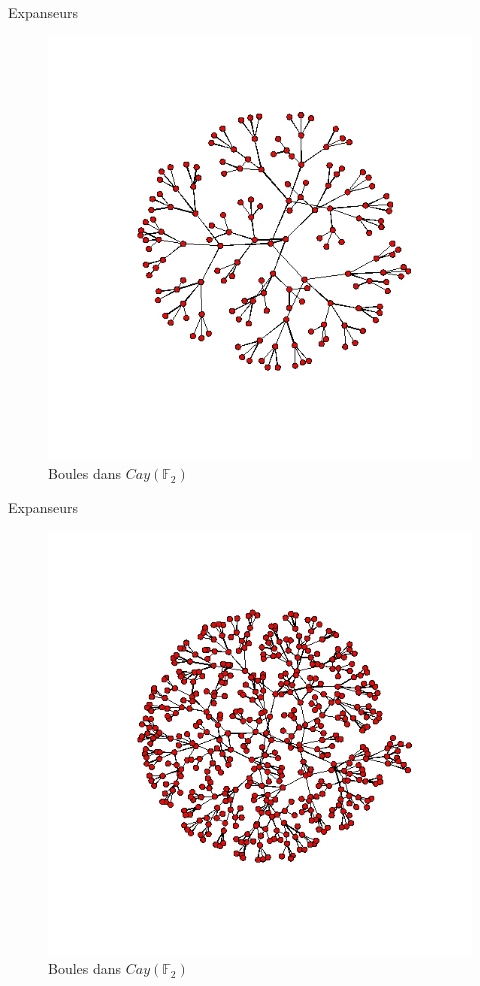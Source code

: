 \begin{frame}{Expanseurs}
\begin{figure}[h]\centering
\includegraphics[scale=0.35]{CayleyFree3.jpeg}
\caption{Boules dans $Cay(\mathbb F_2)$}
\label{fig:Cayley2}
\end{figure}
\end{frame}
\begin{frame}{Expanseurs}
\begin{figure}[h]\centering
\includegraphics[scale=0.35]{CayleyFree4.jpeg}
\caption{Boules dans $Cay(\mathbb F_2)$}
\label{fig:Cayley3}
\end{figure}
\end{frame}
